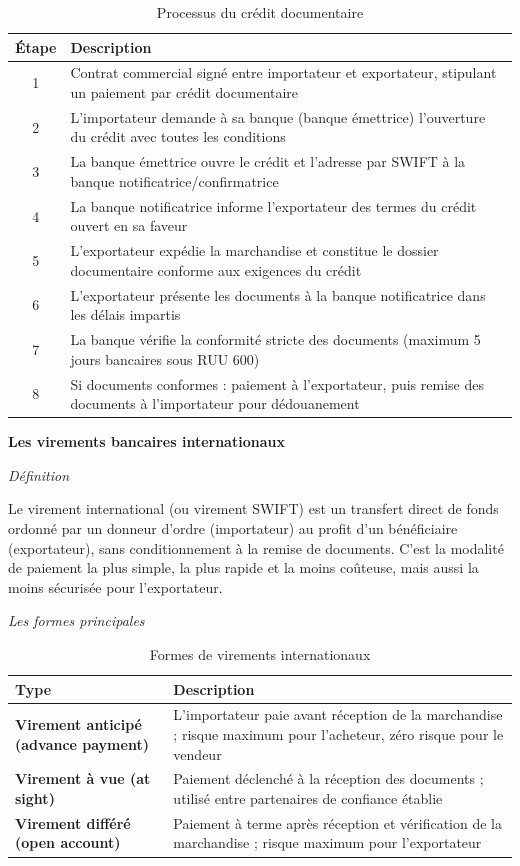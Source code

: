 \begin{table}[h!]
\centering
\begin{tabularx}{\textwidth}{c X}
\toprule
Étape & Description \\
\midrule
1 & Contrat commercial signé entre importateur et exportateur, stipulant un paiement par crédit documentaire \\
2 & L'importateur demande à sa banque (banque émettrice) l'ouverture du crédit avec toutes les conditions \\
3 & La banque émettrice ouvre le crédit et l'adresse par SWIFT à la banque notificatrice/confirmatrice \\
4 & La banque notificatrice informe l'exportateur des termes du crédit ouvert en sa faveur \\
5 & L'exportateur expédie la marchandise et constitue le dossier documentaire conforme aux exigences du crédit \\
6 & L'exportateur présente les documents à la banque notificatrice dans les délais impartis \\
7 & La banque vérifie la conformité stricte des documents (maximum 5 jours bancaires sous RUU 600) \\
8 & Si documents conformes : paiement à l'exportateur, puis remise des documents à l'importateur pour dédouanement \\
\bottomrule
\end{tabularx}
\caption{Processus du crédit documentaire}
\end{table}

\medskip\textbf{Les virements bancaires internationaux}

\medskip\textit{Définition}

Le virement international (ou virement SWIFT) est un transfert direct de fonds ordonné par un donneur d'ordre (importateur) au profit d'un bénéficiaire (exportateur), sans conditionnement à la remise de documents. C'est la modalité de paiement la plus simple, la plus rapide et la moins coûteuse, mais aussi la moins sécurisée pour l'exportateur.

\medskip\textit{Les formes principales}

\begin{table}[h!]
\centering
\begin{tabularx}{\textwidth}{>{\bfseries}l X}
\toprule
Type & Description \\
\midrule
Virement anticipé (advance payment) & L'importateur paie avant réception de la marchandise ; risque maximum pour l'acheteur, zéro risque pour le vendeur \\
\addlinespace
Virement à vue (at sight) & Paiement déclenché à la réception des documents ; utilisé entre partenaires de confiance établie \\
\addlinespace
Virement différé (open account) & Paiement à terme après réception et vérification de la marchandise ; risque maximum pour l'exportateur \\
\bottomrule
\end{tabularx}
\caption{Formes de virements internationaux}
\end{table}

